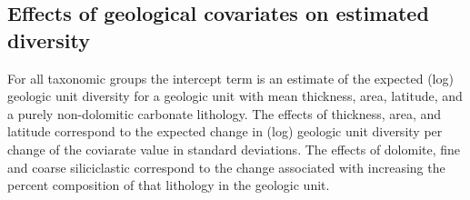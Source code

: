\documentclass[12pt,letterpaper]{article}
\begin{document}
\subsection{Effects of geological covariates on estimated diversity}


For all taxonomic groups the intercept term is an estimate of the expected (log) geologic unit diversity for a geologic unit with mean thickness, area, latitude, and a purely non-dolomitic carbonate lithology. The effects of thickness, area, and latitude correspond to the expected change in (log) geologic unit diversity per change of the coviarate value in standard deviations. The effects of dolomite, fine and coarse siliciclastic correspond to the change associated with increasing the percent composition of that lithology in the geologic unit.
\end{document}
